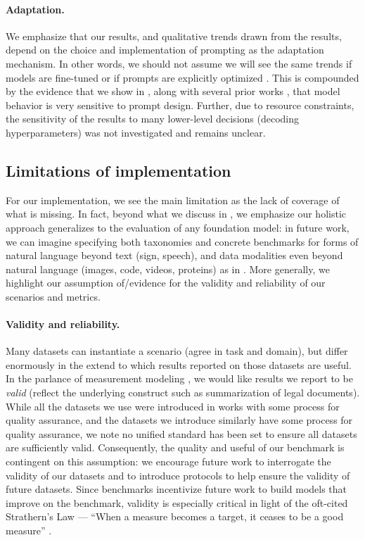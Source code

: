 \paragraph{Adaptation.}
We emphasize that our results, and qualitative trends drawn from the results, depend on the choice and implementation of prompting as the adaptation mechanism.
In other words, we should not assume we will see the same trends if models are fine-tuned or if prompts are explicitly optimized \citep{shin2020autoprompt, zhou2022large}.
This is compounded by the evidence that we show in , along with several prior works \citep[\eg][]{bach2022promptsource}, that model behavior is very sensitive to prompt design.
Further, due to resource constraints, the sensitivity of the results to many lower-level decisions (\eg decoding hyperparameters) was not investigated and remains unclear. 

\subsection{Limitations of \benchmarkname implementation}
For our implementation, we see the main limitation as the lack of coverage of what is missing.
In fact, beyond what we discuss in , we emphasize our holistic approach generalizes to the evaluation of any foundation model: in future work, we can imagine specifying both taxonomies and concrete benchmarks for forms of natural language beyond text (\eg sign, speech), and data modalities even beyond natural language (\eg images, code, videos, proteins) as in \citet{tamkin2021dabs, tamkin2022dabs2}.
More generally, we highlight our assumption of/evidence for the validity and reliability of our scenarios and metrics.

\paragraph{Validity and reliability.}
Many datasets can instantiate a scenario (\ie agree in task and domain), but differ enormously in the extend to which results reported on those datasets are useful.
In the parlance of measurement modeling \citep{loevinger1957objective, messick1987validity, messick1988assessing, jackman2008measurement, liao2021are, jacobs2021measurement}, we would like results we report to be \textit{valid} (\ie reflect the underlying construct such as summarization of legal documents).
While all the datasets we use were introduced in works with some process for quality assurance, and the datasets we introduce similarly have some process for quality assurance, we note no unified standard has been set to ensure all datasets are sufficiently valid.
Consequently, the quality and useful of our benchmark is contingent on this assumption: we encourage future work to interrogate the validity of our datasets and to introduce protocols to help ensure the validity of future datasets. 
Since benchmarks incentivize future work to build models that improve on the benchmark, validity is especially critical in light of the oft-cited Strathern's Law \citep{strathern1997improving} --- ``When a measure becomes a target, it ceases to be a good measure'' \citep[also see][]{goodhart1984problems, linzen2020accelerate, bowman2021fix}.

